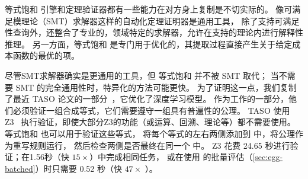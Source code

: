 等式饱和 引擎和定理验证器都有一些能力在对方身上复制是不切实际的。
像可满足模理论（SMT）求解器这样的自动化定理证明器是通用工具，
  除了支持可满足性查询外，还整合了专业的，领域特定的求解器，允许在支持的理论内进行解释性推理。
另一方面，等式饱和 是专门用于优化的，其提取过程直接产生关于给定成本函数的最优的项。


尽管SMT求解器确实是更通用的工具，但 等式饱和 并不被 SMT 取代；
  当不需要 SMT 的完全通用性时，特异化的方法可能更快。
为了证明这一点，我们复制了最近 TASO 论文的一部分~\cite{taso}，它优化了深度学习模型。
作为工作的一部分，他们必须验证一组合成等式，它们需要遵守一组具有普遍性的公理。 %
TASO 使用 Z3~\cite{z3} 执行验证，即使大部分Z3的功能（或运算、回溯、理论等）都不需要使用。
等式饱和 也可以用于验证这些等式，
  将每个等式的左右两侧添加到 \egraph 中，将公理作为重写规则运行，
  然后检查两侧是否最终在同一个 \eclass 中。
Z3 花费 24.65 秒进行验证；\egg 在1.56秒（快 $15\times$）中完成相同任务，
  或在使用 \egg 的批量评估（\autoref{sec:egg-batched}）时只需要 0.52 秒（快 $47\times$ ）。
  

